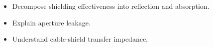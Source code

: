 \begin{objectives}
\begin{itemize}[leftmargin=1.4em,itemsep=2pt]
\item Decompose shielding effectiveness into reflection and absorption.
\item Explain aperture leakage.
\item Understand cable-shield transfer impedance.
\end{itemize}
\end{objectives}
